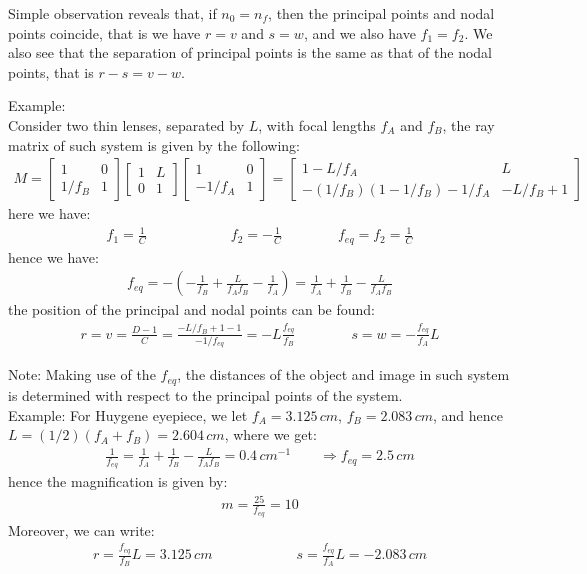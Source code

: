 \documentclass[11pt]{book}
\theoremstyle{break}
\theoremstyle{break}
\newcommand{\bmat}[1]{\begin{bmatrix} #1 \end{bmatrix}}
\newcommand{\note}{\color{red}Note: \color{black}}
\newcommand{\example}{\color{green}Example: \color{black}}
\begin{document}
Simple observation reveals that, if $n_0 = n_f$, then the principal points and nodal points coincide, that is we have $r=v$ and $s=w$, and we also have $f_1 = f_2$. We also see that the separation of principal points is the same as that of the nodal points, that is $r-s = v-w$.

\newpage
\example\\
Consider two thin lenses, separated by $L$, with focal lengths $f_A$ and $f_B$, the ray matrix of such system is given by the following:
\begin{align*}
M = \bmat{1 & 0 \\ 1/f_B & 1}\bmat{1 & L \\ 0 & 1} \bmat{1 & 0 \\ -1/f_A & 1}
=\bmat{1 - L/f_A &  L \\ -(1/f_B) (1-1/f_B) - 1/f_A & -L/f_B + 1}
\end{align*}
here we have:
\begin{align*}
f_1 = \frac{1}{C} \qquad \qquad \qquad f_2 = -\frac{1}{C} \qquad \qquad f_{eq} = f_2 = \frac{1}{C}
\end{align*}
hence we have:
\begin{align*}
f_{eq} =- \left( -\frac{1}{f_B} + \frac{L}{f_A f_B} - \frac{1}{f_A}\right) = \frac{1}{f_A} + \frac{1}{f_B} - \frac{L}{f_A f_B}
\end{align*}
the position of the principal and nodal points can be found:
\begin{align*}
r = v = \frac{D-1}{C} = \frac{- L/f_B + 1 - 1}{-1/f_{eq}} = -L \frac{f_{eq}}{f_B}
\qquad\qquad
s = w = -\frac{f_{eq}}{f_A} L
\end{align*}

\hfill\break
\note Making use of the $f_{eq}$, the distances of the object and image in such system is determined with respect to the principal points of the system. \\

\example 
For Huygene eyepiece, we let $f_A = 3.125\, cm$, $f_B = 2.083\, cm$, and hence $L = (1/2)(f_A + f_B) = 2.604\, cm$, where we get:
\begin{align*}
\frac{1}{f_{eq}} = \frac{1}{f_A} + \frac{1}{f_B} - \frac{L}{f_A f_B} = 0.4 \,cm^{-1} \qquad \Rightarrow f_{eq} = 2.5\, cm
\end{align*}
hence the magnification is given by:
\begin{align*}
m = \frac{25}{f_{eq}} = 10
\end{align*}
Moreover, we can write:
\begin{align*}
r = \frac{f_{eq}}{f_B}L = 3.125\, cm \qquad\qquad\qquad s = \frac{f_{eq}}{f_A}L = -2.083\, cm
\end{align*}
\end{document}
